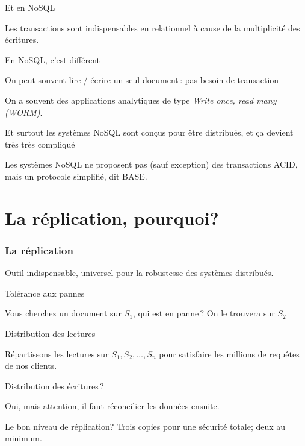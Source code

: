 \begin{frame}{Et en NoSQL}

Les transactions sont indispensables en relationnel à cause de la multiplicité des
écritures.
\vfill

En NoSQL, c'est différent

\begin{redbullet}

  \item  On peut souvent lire / écrire un seul document\,: pas besoin de transaction
  
  \item On a souvent des applications analytiques de type \textit{Write once, read many (WORM)}. 
  
  \item Et \alert{surtout} les systèmes NoSQL sont conçus pour être
      distribués, et ça devient très très compliqué 
  
\end{redbullet}

\vfill

Les systèmes NoSQL ne proposent pas (sauf exception) des transactions
ACID, mais un protocole simplifié, dit BASE.

\end{frame}

\section{La réplication, pourquoi?}

\begin{frame}
\frametitle{La réplication}

Outil indispensable, universel pour la robustesse des systèmes distribués.

\begin{redbullet}
  \item \alert{Tolérance aux pannes}
  
     Vous cherchez un document sur $S_1$, qui est en panne\,? On le trouvera sur $S_2$
     
 \item \alert{Distribution des lectures}
 
    Répartissons les lectures sur $S_1, S_2, \ldots, S_n$ pour satisfaire les millions de requêtes de nos clients.
    
 \item \alert{Distribution des écritures\,?}
 
    Oui, mais attention, il faut \alert{réconcilier} les données ensuite.
    
 \end{redbullet}

Le bon niveau de réplication? \alert{Trois copies pour une sécurité totale; deux au minimum}.

\end{frame}


